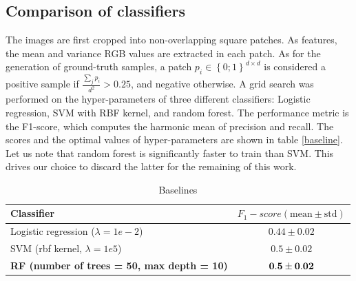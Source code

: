 \documentclass[10pt,conference,compsocconf]{IEEEtran}
\begin{document}
	\subsection{Comparison of classifiers}
	\label{baseline_selection}

  The images are first cropped into non-overlapping square patches. As features,
  the mean and variance RGB values are extracted in each patch. As for the
  generation of ground-truth samples, a patch $p_i \in
  \left\{0;1\right\}^{d \times d}$ is
  considered a positive sample if $\frac{\sum_{j}{p_i}}{d^2} > 0.25$, and negative otherwise.
A grid search was performed on the hyper-parameters of three different classifiers:
  Logistic regression, SVM with RBF kernel, and random forest.
	The performance metric is the F1-score, which computes the
  harmonic mean of precision and recall.
	The scores and the optimal values of hyper-parameters are shown in table
  \ref{baseline}. Let us note that random forest is significantly faster to
  train than SVM. This drives our choice to discard the latter for the remaining
  of this work.
		\begin{table}[h]
		\caption{\label{baselines}Baselines}
		\centering
		\begin{tabular}{p{} c}		
			\textbf{Classifier} &  \textbf{$F_1-score (\text{mean}\pm \text{std})$}\\
			\hline \hline
			Logistic regression ($\lambda = 1e-2$) & $0.44 \pm 0.02$ \\ \hline
			SVM (rbf kernel, $\lambda = 1e5$) & $0.5 \pm 0.02$ \\ \hline
			\textbf{RF (number of trees = 50, max depth = 10)} & $\bf{0.5 \pm 0.02}$ \\
			\hline
		\end{tabular}
		\end{table}
\end{document}
